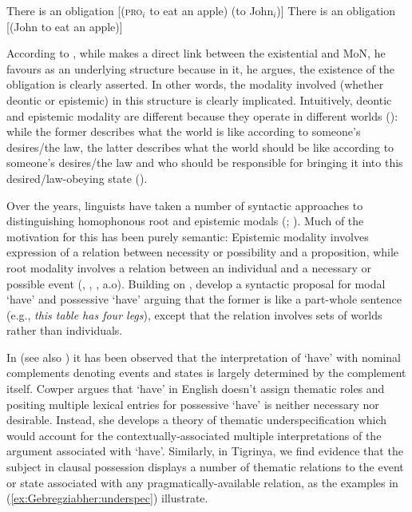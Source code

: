 \documentclass[output=paper]{langscibook}
\begin{document}
\ea\label{ex:Gebregziabher:labelgoto}
\ea\label{ex:Gebregziabher:labelgotoA} There is an obligation [({\scshape pro}$_i$ to eat an apple) (to John$_i$)]
\ex\label{ex:Gebregziabher:labelgotoB} There is an obligation [(John to eat an apple)] \\ \citep[(12)]{bhatt97}
\z
\z

\noindent According to \citeauthor{bhatt97}, while  makes a direct link between the existential and MoN, he favours  as an underlying structure because in it, he argues, the existence of the obligation is clearly asserted. In other words, the modality involved (whether deontic or epistemic) in this structure is clearly implicated. Intuitively, deontic and epistemic modality are different because they operate in different worlds (\citealt{kratzer2006}): while the former describes what the world is like according to someone's desires/the law, the latter describes what the world should be like according to someone's desires/the law and who should be responsible for bringing it into this desired/law-obeying state (\citealt{Bhatt:1997}). 

Over the years, linguists have taken a number of syntactic approaches to distinguishing homophonous root and epistemic modals (\citealt{matthewsonetal2005}; \citealt{vonFintel:2006}). Much of the motivation for this has been purely semantic: Epistemic modality involves expression of a relation between necessity or possibility and a proposition, while root modality involves a relation between an individual and a necessary or possible event (\citealt[967--968]{butler03}, \citealt[166--167]{matthewsonetal2005}, \citealt[2]{vonFintel:2006}, a.o). Building on \citet{cowper89}, \citet{cowperandbjorkman2016} develop a syntactic proposal for modal `have' and possessive `have' arguing that the former is like a part-whole sentence (e.g., \emph{this table has four legs}), except that the relation involves sets of worlds rather than individuals.

In \citet{cowper89} (see also \citealt{ritterandrosen1997}) it has been observed that the interpretation of `have' with nominal complements denoting events and states is largely determined by the complement itself. Cowper argues that `have' in English doesn't assign thematic roles and positing multiple lexical entries for possessive `have' is neither necessary nor desirable. Instead, she develops a theory of thematic underspecification which would account for the contextually-associated multiple interpretations of the argument associated with `have'. 
Similarly, in Tigrinya, we find evidence that the subject in clausal possession displays a number of thematic relations to the event or state associated with any pragmatically-available relation, as the examples in (\ref{ex:Gebregziabher:underspec}) illustrate.\largerpage
\end{document}
